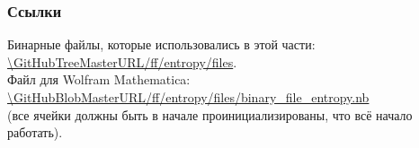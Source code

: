 \subsubsection{Ссылки}

Бинарные файлы, которые использовались в этой части:\\
\url{\GitHubTreeMasterURL/ff/entropy/files}.\\
Файл для Wolfram Mathematica: \\
\url{\GitHubBlobMasterURL/ff/entropy/files/binary_file_entropy.nb} \\
(все ячейки должны быть в начале проинициализированы, что всё начало работать).

